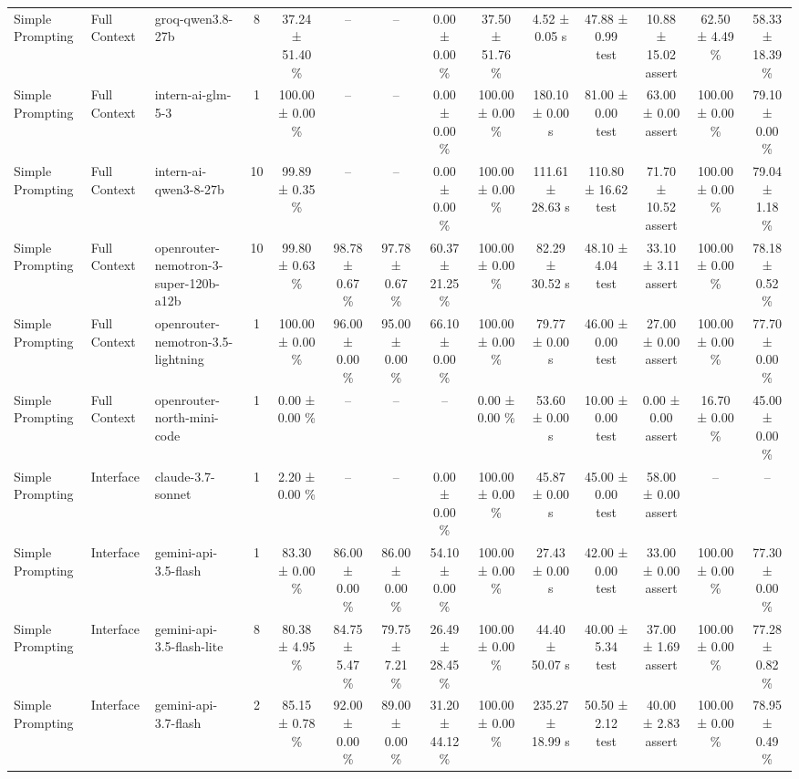 \begin{table}[htbp]
\begin{tabular}{lllccccccccccc}
Simple Prompting & Full Context & groq-qwen3.8-27b & 8 & 37.24 ± 51.40 \% & – & – & 0.00 ± 0.00 \% & 37.50 ± 51.76 \% & 4.52 ± 0.05 s & 47.88 ± 0.99 test & 10.88 ± 15.02 assert & 62.50 ± 4.49 \% & 58.33 ± 18.39 \% \\
Simple Prompting & Full Context & intern-ai-glm-5-3 & 1 & 100.00 ± 0.00 \% & – & – & 0.00 ± 0.00 \% & 100.00 ± 0.00 \% & 180.10 ± 0.00 s & 81.00 ± 0.00 test & 63.00 ± 0.00 assert & 100.00 ± 0.00 \% & 79.10 ± 0.00 \% \\
Simple Prompting & Full Context & intern-ai-qwen3-8-27b & 10 & 99.89 ± 0.35 \% & – & – & 0.00 ± 0.00 \% & 100.00 ± 0.00 \% & 111.61 ± 28.63 s & 110.80 ± 16.62 test & 71.70 ± 10.52 assert & 100.00 ± 0.00 \% & 79.04 ± 1.18 \% \\
Simple Prompting & Full Context & openrouter-nemotron-3-super-120b-a12b & 10 & 99.80 ± 0.63 \% & 98.78 ± 0.67 \% & 97.78 ± 0.67 \% & 60.37 ± 21.25 \% & 100.00 ± 0.00 \% & 82.29 ± 30.52 s & 48.10 ± 4.04 test & 33.10 ± 3.11 assert & 100.00 ± 0.00 \% & 78.18 ± 0.52 \% \\
Simple Prompting & Full Context & openrouter-nemotron-3.5-lightning & 1 & 100.00 ± 0.00 \% & 96.00 ± 0.00 \% & 95.00 ± 0.00 \% & 66.10 ± 0.00 \% & 100.00 ± 0.00 \% & 79.77 ± 0.00 s & 46.00 ± 0.00 test & 27.00 ± 0.00 assert & 100.00 ± 0.00 \% & 77.70 ± 0.00 \% \\
Simple Prompting & Full Context & openrouter-north-mini-code & 1 & 0.00 ± 0.00 \% & – & – & – & 0.00 ± 0.00 \% & 53.60 ± 0.00 s & 10.00 ± 0.00 test & 0.00 ± 0.00 assert & 16.70 ± 0.00 \% & 45.00 ± 0.00 \% \\
Simple Prompting & Interface & claude-3.7-sonnet & 1 & 2.20 ± 0.00 \% & – & – & 0.00 ± 0.00 \% & 100.00 ± 0.00 \% & 45.87 ± 0.00 s & 45.00 ± 0.00 test & 58.00 ± 0.00 assert & – & – \\
Simple Prompting & Interface & gemini-api-3.5-flash & 1 & 83.30 ± 0.00 \% & 86.00 ± 0.00 \% & 86.00 ± 0.00 \% & 54.10 ± 0.00 \% & 100.00 ± 0.00 \% & 27.43 ± 0.00 s & 42.00 ± 0.00 test & 33.00 ± 0.00 assert & 100.00 ± 0.00 \% & 77.30 ± 0.00 \% \\
Simple Prompting & Interface & gemini-api-3.5-flash-lite & 8 & 80.38 ± 4.95 \% & 84.75 ± 5.47 \% & 79.75 ± 7.21 \% & 26.49 ± 28.45 \% & 100.00 ± 0.00 \% & 44.40 ± 50.07 s & 40.00 ± 5.34 test & 37.00 ± 1.69 assert & 100.00 ± 0.00 \% & 77.28 ± 0.82 \% \\
Simple Prompting & Interface & gemini-api-3.7-flash & 2 & 85.15 ± 0.78 \% & 92.00 ± 0.00 \% & 89.00 ± 0.00 \% & 31.20 ± 44.12 \% & 100.00 ± 0.00 \% & 235.27 ± 18.99 s & 50.50 ± 2.12 test & 40.00 ± 2.83 assert & 100.00 ± 0.00 \% & 78.95 ± 0.49 \% \\

\end{tabular}
\end{table}
